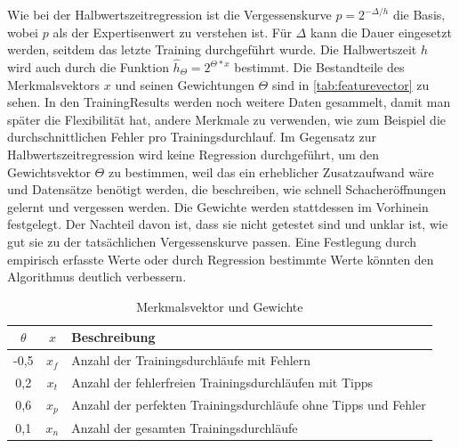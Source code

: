 
Wie bei der Halbwertszeitregression ist die Vergessenskurve $p = 2^{-\Delta/h}$ die Basis, wobei $p$ als der Expertisenwert zu verstehen ist. Für $\Delta$ kann die Dauer eingesetzt werden, seitdem das letzte Training durchgeführt wurde.
Die Halbwertszeit $h$ wird auch durch die Funktion $\hat{h}_\Theta = 2^{\Theta*x}$ bestimmt.
Die Bestandteile des Merkmalsvektors $x$ und seinen Gewichtungen $\Theta$ sind in \autoref{tab:featurevector} zu sehen.
In den TrainingResults werden noch weitere Daten gesammelt, damit man später die Flexibilität hat, andere Merkmale zu verwenden, wie zum Beispiel die durchschnittlichen Fehler pro Trainingsdurchlauf.
Im Gegensatz zur Halbwertszeitregression wird keine Regression durchgeführt, um den Gewichtsvektor $\Theta$ zu bestimmen, weil das ein erheblicher Zusatzaufwand wäre und Datensätze benötigt werden, die beschreiben, wie schnell Schacheröffnungen gelernt und vergessen werden. Die Gewichte werden stattdessen im Vorhinein festgelegt. Der Nachteil davon ist, dass sie nicht getestet sind und unklar ist, wie gut sie zu der tatsächlichen Vergessenskurve passen. Eine Festlegung durch empirisch erfasste Werte oder durch Regression bestimmte Werte könnten den Algorithmus deutlich verbessern.

\begin{table}[htb]
    \centering
    \begin{tabular}{|c|c|l|}
        \hline
        $\theta$ & $x$ & Beschreibung \\
        \hline
        -0,5 & $x_f$ & Anzahl der Trainingsdurchläufe mit Fehlern \\
        \hline
        0,2 & $x_t$ & Anzahl der fehlerfreien Trainingsdurchläufen mit Tipps \\
        \hline
        0,6 & $x_p$ & Anzahl der perfekten Trainingsdurchläufe ohne Tipps und Fehler \\
        \hline
        0,1 & $x_n$ & Anzahl der gesamten Trainingsdurchläufe \\
        \hline
    \end{tabular}
    \caption{Merkmalsvektor und Gewichte}
    \label{tab:featurevector}
\end{table}

